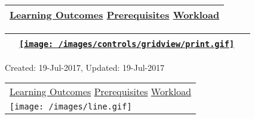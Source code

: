 ~

\hypertarget{ctl00_ctl00_ContentPlaceHolder1_ContentPlaceHolder1_pnlReferences}{}
\begin{longtable}[]{@{}l@{}}
\toprule
\protect\hypertarget{ctl00_ctl00_ContentPlaceHolder1_ContentPlaceHolder1_lblSectionBottom}{}{\protect\hyperlink{Learningux5cux2520Outcomes}{Learning
Outcomes} \textbar{} \protect\hyperlink{Prerequisites}{Prerequisites}
\textbar{} \protect\hyperlink{Workload}{Workload}}\tabularnewline
\bottomrule
\end{longtable}

\hypertarget{ctl00_ctl00_ContentPlaceHolder1_ContentPlaceHolder1_UP}{}
\hypertarget{contentstart}{}
\hypertarget{ctl00_ctl00_ContentPlaceHolder1_ContentPlaceHolder1_pnlMain}{}
\begin{longtable}[]{@{}ll@{}}
\toprule
&
{\href{javascript:PrintThisPage();}{\texttt{[image: /images/controls/gridview/print.gif]}}~~}\tabularnewline
\bottomrule
\end{longtable}

\protect\hypertarget{ctl00_ctl00_ContentPlaceHolder1_ContentPlaceHolder1_LV_UpdateInfo_ctrl0_txtDate}{}{Created:
19-Jul-2017, Updated: 19-Jul-2017}

\begin{longtable}[]{@{}l@{}}
\toprule
\protect\hypertarget{ctl00_ctl00_ContentPlaceHolder1_ContentPlaceHolder1_lblSectionTop}{}{\protect\hyperlink{Learningux5cux2520Outcomes}{Learning
Outcomes} \textbar{} \protect\hyperlink{Prerequisites}{Prerequisites}
\textbar{} \protect\hyperlink{Workload}{Workload}}\tabularnewline
\texttt{[image: /images/line.gif]}\tabularnewline
\bottomrule
\end{longtable}

